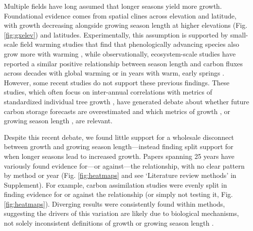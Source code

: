 \documentclass[11pt]{article}
\begin{document}
Multiple fields have long assumed that longer seasons yield more growth. Foundational evidence comes from spatial clines across elevation and latitude, with growth decreasing alongside growing season length at higher elevations (Fig. \ref{fig:gxelev}) and latitudes. Experimentally, this assumption is supported by small-scale field warming studies that find that phenologically advancing species also grow more with warming \citep[][]{Cleland:2012}, while observationally, ecosystem-scale studies have reported a similar positive relationship between season length and carbon fluxes across decades with global warming \citep{keenan2014net} or in years with warm, early springs \citep{chen1999effects}. However, some recent studies do not support these previous findings.  These studies, which often focus on inter-annual correlations with metrics of standardized individual tree growth \citep{dow2022warm,silvestro2023longer}, have generated debate about whether future carbon storage forecasts are overestimated and which metrics of growth \citep{green2022limits}, or growing season length \citep{korner2023four}, are relevant.

Despite this recent debate, we found little support for a wholesale disconnect between growth and growing season length---instead finding split support for when longer seasons lead to increased growth. Papers spanning 25 years have variously found evidence for---or against---the relationship, with no clear pattern by method or year (Fig. \ref{fig:heatmaps} and see `Literature review methods' in Supplement). For example, carbon assimilation studies were evenly split in finding evidence for or against the relationship  (or simply not testing it, Fig. \ref{fig:heatmaps}). Diverging results were consistently found within methods, suggesting the drivers of this variation are likely due to biological mechanisms, not solely inconsistent definitions of growth or growing season length \citep[as some have recently suggested, e.g. ][]{green2022limits,korner2023four}. 
\end{document}
